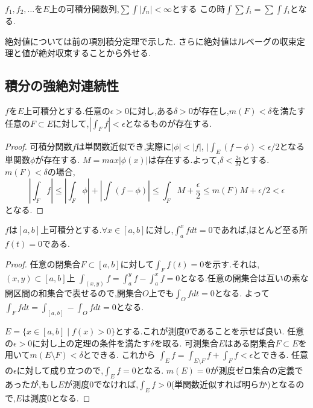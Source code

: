 \begin{thm}[項別積分定理]
 $f_1, f_2, \ldots$を$E$上の可積分関数列,$\sum \int |f_n| < \infty$とする
 この時$\int \sum f_i = \sum \int f_i$となる.
\end{thm}
絶対値については前の項別積分定理で示した.
さらに絶対値はルベーグの収束定理と値が絶対収束することから外せる.

\subsection{積分の強絶対連続性}

\begin{thm}\label{thm:strong conti}
 $f$を$E$上可積分とする.任意の$\epsilon > 0$に対し,ある$\delta >0$が存在し,$m(F) < \delta$を満たす任意の$F \subset E$に対して,$|\int_F f | < \epsilon$となるものが存在する.
\end{thm}
\begin{proof}
可積分関数$f$は単関数近似でき,実際に$|\phi| < |f|$, $| \int_E (f - \phi) < \epsilon / 2 $となる単関数$\phi$が存在する.
$M = max|\phi(x)|$は存在する.よって,$\delta < \frac{2 \epsilon}{M}$とする.$m(F) < \delta$の場合,
\begin{equation*}
    \left|\int_F f \right| \le \left| \int_F \phi \right| + \left| \int (f -\phi) \right| \le \int_F M + \frac{\epsilon}{2} \le m(F)M + \epsilon / 2 < \epsilon
\end{equation*}
となる.
\end{proof}


\begin{lem}
$f$は$[a, b]$上可積分とする.$\forall x \in [a, b]$に対し,$\int_a^x f dt = 0$であれば,ほとんど至る所$f(t) = 0$である.
\end{lem}
\begin{proof}
任意の閉集合$F \subset [a, b]$に対して$\int_F f(t) = 0$を示す.それは,$(x, y) \subset [a, b]$上
$\int_{(x, y)} f = \int_a^y f - \int_a^x f = 0$となる.任意の開集合は互いの素な開区間の和集合で表せるので,開集合$O$上でも$\int_O f dt = 0$となる.
よって$\int_F f dt = \int_{[a, b]} - \int_O f dt = 0$となる.

$E = \{x \in [a, b] \mid  f(x) > 0\}$とする.これが測度0であることを示せば良い.
任意の$\epsilon > 0$に対し上の定理の条件を満たす$\delta$を取る.
可測集合$E$はある閉集合$F \subset E$を用いて$m(E \setminus F) < \delta$とできる.
これから
$\int_E f = \int_{E \setminus F} f + \int_F f < \epsilon$とできる.
任意の$\epsilon$に対して成り立つので,$\int_E f = 0$となる.
$m(E) = 0$が測度ゼロ集合の定義であったが,もし$E$が測度0でなければ,$\int_E f  > 0$(単関数近似すれば明らか)となるので,$E$は測度0となる.
\end{proof}

